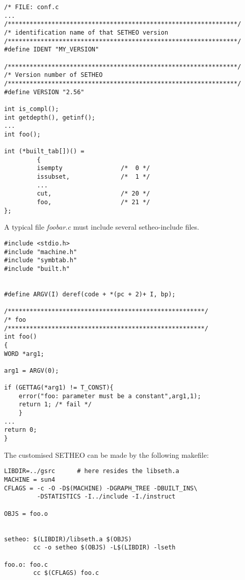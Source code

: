 \begin{verbatim}
/* FILE: conf.c
...
/***************************************************************/
/* identification name of that SETHEO version
/***************************************************************/
#define IDENT "MY_VERSION"

/***************************************************************/
/* Version number of SETHEO
/***************************************************************/
#define VERSION "2.56"

int is_compl();
int getdepth(), getinf();
...
int foo();

int (*built_tab[])() =
         {
         isempty                /*  0 */
         issubset,              /*  1 */
         ...
         cut,                   /* 20 */
         foo,                   /* 21 */
};
\end{verbatim}


A typical file {\em foobar.c\/} must include several setheo-include files.

\begin{verbatim}
#include <stdio.h>
#include "machine.h"
#include "symbtab.h"
#include "built.h"


#define ARGV(I) deref(code + *(pc + 2)+ I, bp);

/******************************************************/
/* foo
/******************************************************/
int foo()
{
WORD *arg1;

arg1 = ARGV(0);

if (GETTAG(*arg1) != T_CONST){
	error("foo: parameter must be a constant",arg1,1);
	return 1; /* fail */
	}
...
return 0;
}
\end{verbatim}

The customised SETHEO can be made by the following makefile:

\begin{verbatim}
LIBDIR=../gsrc      # here resides the libseth.a
MACHINE = sun4
CFLAGS = -c -O -D$(MACHINE) -DGRAPH_TREE -DBUILT_INS\
         -DSTATISTICS -I../include -I./instruct
	
OBJS = foo.o


setheo: $(LIBDIR)/libseth.a $(OBJS)
        cc -o setheo $(OBJS) -L$(LIBDIR) -lseth

foo.o: foo.c  
        cc $(CFLAGS) foo.c
\end{verbatim}

